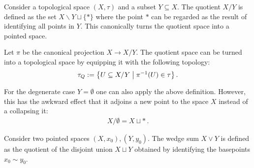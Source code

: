     \begin{construct}\label{topology:quotient_space}
        Consider a topological space $(X,\tau)$ and a subset $Y\subseteq X$. The quotient $X/Y$ is defined as the set $X\backslash Y\sqcup\{\ast\}$ where the point $\ast$ can be regarded as the result of identifying all points in $Y$. This canonically turns the quotient space into a pointed space.

        Let $\pi$ be the canonical projection $X\rightarrow X/Y$. The quotient space can be turned into a topological space by equipping it with the following topology:
        \begin{gather}
            \tau_Q := \bigl\{U\subseteq X/Y\bigm\vert\pi^{-1}(U)\in\tau\bigr\}\,.
        \end{gather}
    \end{construct}
    \begin{remark}
        For the degenerate case $Y=\emptyset$ one can also apply the above definition. However, this has the awkward effect that it adjoins a new point to the space $X$ instead of a collapsing it:
        \begin{gather}
            \label{topology:empty_quotient}
            X/\emptyset = X\sqcup\ast\,.
        \end{gather}
    \end{remark}

    \begin{construct}
        Consider two pointed spaces $(X,x_0),(Y,y_0)$. The wedge sum $X\vee Y$ is defined as the quotient of the disjoint union $X\sqcup Y$ obtained by identifying the basepoints $x_0\sim y_0$.
    \end{construct}

